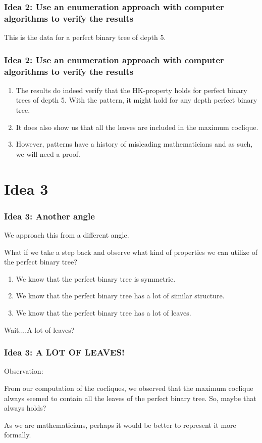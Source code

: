 \documentclass[10pt,]{beamer}
\theoremstyle{conjectureStyle}
\theoremstyle{notationStyle}
\theoremstyle{claimStyle}
\begin{document}
\begin{frame}\frametitle{Idea 2: Use an enumeration approach with computer algorithms to verify the results}
    This is the data for a perfect binary tree of depth 5.
    \centering
\end{frame}

\begin{frame}\frametitle{Idea 2: Use an enumeration approach with computer algorithms to verify the results}
    \begin{enumerate}[<+->]
        \item The results do indeed verify that the HK-property holds for perfect binary trees of depth 5. With the pattern, it might hold for any depth perfect binary tree.
        \item It does also show us that all the leaves are included in the maximum coclique.
        \item However, patterns have a history of misleading mathematicians and as such, we will need a proof.
    \end{enumerate}
\end{frame}

\section{Idea 3}
\begin{frame}\frametitle{Idea 3: Another angle}
    We approach this from a different angle.

    What if we take a step back and observe what kind of properties we can utilize of the perfect binary tree?

    \begin{enumerate}[<+->]
        \item We know that the perfect binary tree is symmetric.
        \item We know that the perfect binary tree has a lot of similar structure.
        \item We know that the perfect binary tree has a lot of leaves.
    \end{enumerate}

    \pause
    Wait....A lot of leaves?
\end{frame}

\begin{frame}\frametitle{Idea 3: A LOT OF LEAVES!}
    Observation:

    From our computation of the cocliques, we observed that the maximum coclique always seemed to contain all the leaves of the perfect binary tree. So, maybe that always holds?

    As we are mathematicians, perhaps it would be better to represent it more formally.
\end{frame}
\end{document}
